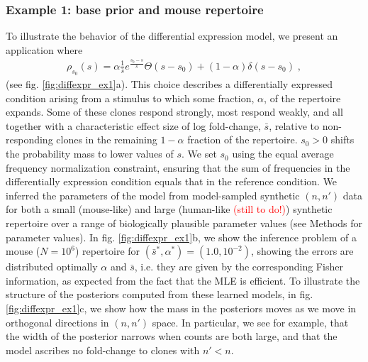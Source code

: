 \documentclass[letterpaper,english,prl,reprint,longbibliography]{revtex4-1} %
\begin{document}
\subsubsection*{Example 1: base prior and mouse repertoire}
To illustrate the behavior of the differential expression model, we present an application where
\begin{align}
	\rho_{s_0}(s)=\alpha\frac{1}{\bar{s}}e^{\frac{s_0-s}{\bar{s}}} \Theta(s-s_0)+(1-\alpha)\delta(s-s_0)\;, \label{eq:Ps_ex1}
\end{align} 
(see fig. \ref{fig:diffexpr_ex1}a). 
This choice describes a differentially expressed condition arising from a stimulus to which some fraction, $\alpha$, of the repertoire expands. 
Some of these clones respond strongly, most respond weakly, and all together with a characteristic effect size of log fold-change, $\bar{s}$, relative to non-responding clones in the remaining $1-\alpha$ fraction of the repertoire. 
$s_0>0$ shifts the probability mass to lower values of $s$. 
We set $s_0$ using the equal average frequency normalization constraint, ensuring that the sum of frequencies in the differentially expression condition equals that in the reference condition.
We inferred the parameters of the model from model-sampled synthetic $(n,n')$ data for both a small (mouse-like) and large (human-like \textcolor{red}{(still to do!)}) synthetic repertoire over a range of biologically plausible parameter values (see Methods for parameter values). 
In fig. \ref{fig:diffexpr_ex1}b, we show the inference problem of a mouse ($N=10^{6}$) repertoire for $(\bar{s}^*,\alpha^* )=(1.0,10^{-2})$, showing the errors are distributed optimally $\alpha$ and $\bar{s}$, i.e. they are given by the corresponding Fisher information, as expected from the fact that the MLE is efficient. To illustrate the structure of the posteriors computed from these learned models, in fig.\ref{fig:diffexpr_ex1}c, we show how the mass in the posteriors moves as we move in orthogonal directions in $(n,n')$ space. In particular, we see for example, that the width of the posterior narrows when counts are both large, and that the model ascribes no fold-change to clones with $n'< n$.
\end{document}
